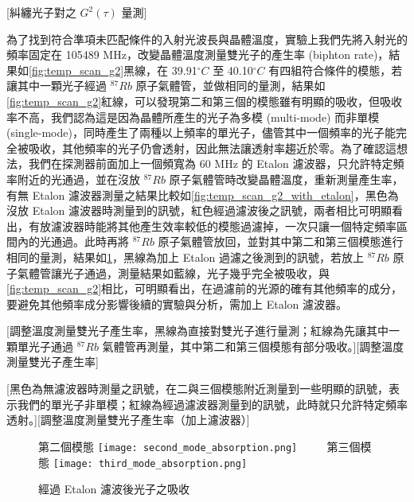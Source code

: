 \documentclass[class=NCU_thesis, crop=false]{standalone}
\begin{document}
[糾纏光子對之 $G^{2}(\tau)$ 量測]

為了找到符合準項未匹配條件的入射光波長與晶體溫度，實驗上我們先將入射光的頻率固定在 105489 MHz，改變晶體溫度測量雙光子的產生率 (biphton rate)，結果如\cref{fig:temp_scan_g2}黑線，在 39.91$^{\circ}C$ 至 40.10$^{\circ}C$ 有四組符合條件的模態，若讓其中一顆光子經過 $^{87}Rb$ 原子氣體管，並做相同的量測，結果如\cref{fig:temp_scan_g2}紅線，可以發現第二和第三個的模態雖有明顯的吸收，但吸收率不高，我們認為這是因為晶體所產生的光子為多模 (multi-mode) 而非單模 (single-mode)，同時產生了兩種以上頻率的單光子，儘管其中一個頻率的光子能完全被吸收，其他頻率的光子仍會透射，因此無法讓透射率趨近於零。為了確認這想法，我們在探測器前面加上一個頻寬為 60 MHz 的 Etalon 濾波器，只允許特定頻率附近的光通過，並在沒放 $^{87}Rb$ 原子氣體管時改變晶體溫度，重新測量產生率，有無 Etalon 濾波器測量之結果比較如\cref{fig:temp_scan_g2_with_etalon}，黑色為沒放 Etalon 濾波器時測量到的訊號，紅色經過濾波後之訊號，兩者相比可明顯看出，有放濾波器時能將其他產生效率較低的模態過濾掉，一次只讓一個特定頻率區間內的光通過。此時再將 $^{87}Rb$ 原子氣體管放回，並對其中第二和第三個模態進行相同的量測，結果如\cref{fig:absorption_etalon_temp_scanning}，黑線為加上 Etalon 過濾之後測到的訊號，若放上 $^{87}Rb$ 原子氣體管讓光子通過，測量結果如藍線，光子幾乎完全被吸收，與\cref{fig:temp_scan_g2}相比，可明顯看出，在過濾前的光源的確有其他頻率的成分，要避免其他頻率成分影響後續的實驗與分析，需加上 Etalon 濾波器。

[調整溫度測量雙光子產生率，黑線為直接對雙光子進行量測；紅線為先讓其中一顆單光子通過 $^{87}Rb$ 氣體管再測量，其中第二和第三個模態有部分吸收。][調整溫度測量雙光子產生率]

[黑色為無濾波器時測量之訊號，在二與三個模態附近測量到一些明顯的訊號，表示我們的單光子非單模；紅線為經過濾波器測量到的訊號，此時就只允許特定頻率透射。][調整溫度測量雙光子產生率（加上濾波器）]

\begin{figure}[!hbt]
    \centering
    \subcaptionbox
        {第二個模態
        \label{fig:subfig_fig1}}
        {\texttt{[image: second\_mode\_absorption.png]}}
    ~~~~
    \subcaptionbox
        {第三個模態
        \label{fig:subfig_fig2}}
        {\texttt{[image: third\_mode\_absorption.png]}}
    \caption{經過 Etalon 濾波後光子之吸收}
    \label{fig:absorption_etalon_temp_scanning}
\end{figure}
\end{document}
